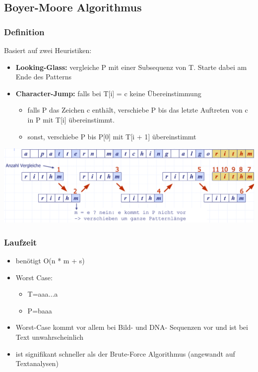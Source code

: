 \subsection{Boyer-Moore Algorithmus}
\subsubsection{Definition}
Basiert auf zwei Heuristiken:
    \begin{itemize}
        \item \textbf{Looking-Glass:} vergleiche P mit einer Subsequenz von T. Starte dabei am Ende des Patterns
        \item \textbf{Character-Jump:} falls bei T[i] = c keine Übereinstimmung
        \begin{itemize}
            \item falls P das Zeichen c enthält, verschiebe P bis das letzte Auftreten von c in P mit T[i] übereinstimmt.
            \item sonst, verschiebe P bis P[0] mit T[i + 1] übereinstimmt
        \end{itemize}
    \end{itemize}
\vspace{-8pt}
\begin{center}
    \includegraphics[scale=.25]{graphic/08 PatternMatching/Boyer-Moore def.png}
\end{center}
\vspace{-8pt}
\subsubsection{Laufzeit}
\begin{itemize}
    \item benötigt O(n * m + s)
    \item Worst Case:
    \begin{itemize}
        \item T=aaa...a
        \item P=baaa
    \end{itemize}
    \item Worst-Case kommt vor allem bei Bild- und DNA- Sequenzen vor und ist bei Text unwahrscheinlich
    \item ist signifikant schneller als der Brute-Force Algorithmus (angewandt auf Textanalysen)
\end{itemize}

